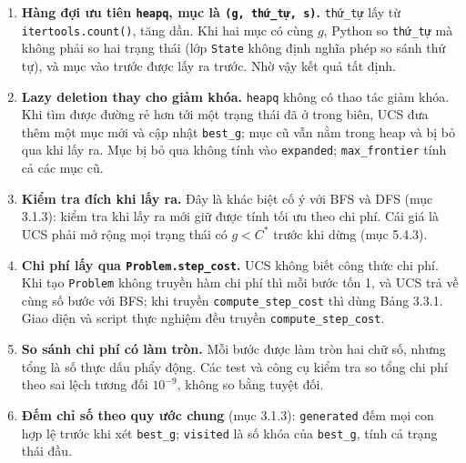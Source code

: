 \begin{enumerate}
\def\labelenumi{\arabic{enumi}.}
\tightlist
\item
  \textbf{Hàng đợi ưu tiên \texttt{heapq}, mục là \texttt{(g, thứ\_\allowbreak{}tự, s)}.} \texttt{thứ\_\allowbreak{}tự} lấy từ \texttt{itertools.\allowbreak{}count()}, tăng dần. Khi hai mục có cùng \(g\), Python so \texttt{thứ\_\allowbreak{}tự} mà không phải so hai trạng thái (lớp \texttt{State} không định nghĩa phép so sánh thứ tự), và mục vào trước được lấy ra trước. Nhờ vậy kết quả tất định.
\item
  \textbf{Lazy deletion thay cho giảm khóa.} \texttt{heapq} không có thao tác giảm khóa. Khi tìm được đường rẻ hơn tới một trạng thái đã ở trong biên, UCS đưa thêm một mục mới và cập nhật \texttt{best\_\allowbreak{}g}; mục cũ vẫn nằm trong heap và bị bỏ qua khi lấy ra. Mục bị bỏ qua không tính vào \texttt{expanded}; \texttt{max\_\allowbreak{}frontier} tính cả các mục cũ.
\item
  \textbf{Kiểm tra đích khi lấy ra.} Đây là khác biệt cố ý với BFS và DFS (mục 3.1.3): kiểm tra khi lấy ra mới giữ được tính tối ưu theo chi phí. Cái giá là UCS phải mở rộng mọi trạng thái có \(g < C^*\) trước khi dừng (mục 5.4.3).
\item
  \textbf{Chi phí lấy qua \texttt{Problem.\allowbreak{}step\_\allowbreak{}cost}.} UCS không biết công thức chi phí. Khi tạo \texttt{Problem} không truyền hàm chi phí thì mỗi bước tốn 1, và UCS trả về cùng số bước với BFS; khi truyền \texttt{compute\_\allowbreak{}step\_\allowbreak{}cost} thì dùng Bảng 3.3.1. Giao diện và script thực nghiệm đều truyền \texttt{compute\_\allowbreak{}step\_\allowbreak{}cost}.
\item
  \textbf{So sánh chi phí có làm tròn.} Mỗi bước được làm tròn hai chữ số, nhưng tổng là số thực dấu phẩy động. Các test và công cụ kiểm tra so tổng chi phí theo sai lệch tương đối \(10^{-9}\), không so bằng tuyệt đối.
\item
  \textbf{Đếm chỉ số theo quy ước chung} (mục 3.1.3): \texttt{generated} đếm mọi con hợp lệ trước khi xét \texttt{best\_\allowbreak{}g}; \texttt{visited} là số khóa của \texttt{best\_\allowbreak{}g}, tính cả trạng thái đầu.
\end{enumerate}

